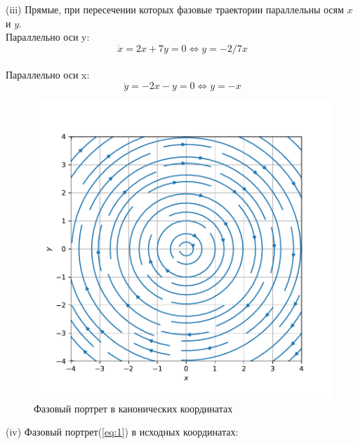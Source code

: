 \documentclass[a4paper, 12pt]{article}
\begin{document}
(iii) Прямые, при пересечении которых фазовые траектории параллельны осям $x$ и $y$.\\
Параллельно оси y:
\[\dot{x} = 2x+7y=0\Leftrightarrow y = -2/7x\]\\
Параллельно оси x:
\[\dot{y} = -2x-y=0\Leftrightarrow y = -x\]
\begin{figure}[H]
	\centering
	\includegraphics[scale=0.7]{3a1_0}
	\caption{Фазовый портрет в канонических координатах}
	\label{im:3a1_0}
\end{figure}



(iv) Фазовый портрет(\ref{eq:1}) в исходных координатах:
\end{document}
